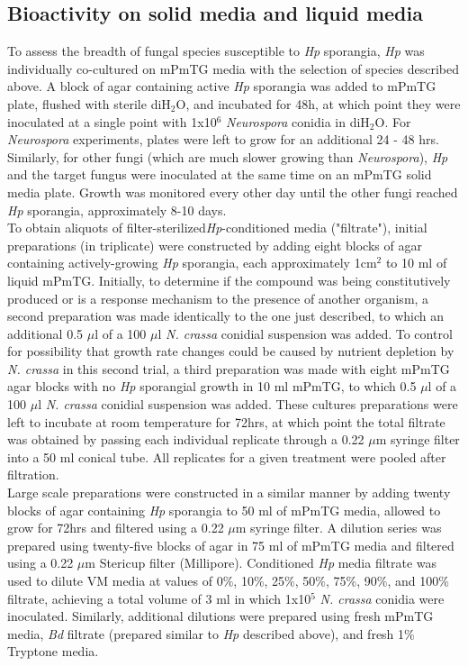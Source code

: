 \subsection*{Bioactivity on solid media and liquid media}
To assess the breadth of fungal species susceptible to \textit{Hp} sporangia, \textit{Hp} was individually co-cultured on mPmTG media with the selection of species described above. A block of agar containing active \textit{Hp} sporangia was added to mPmTG plate, flushed with sterile diH$_{2}$O, and incubated for 48h, at which point they were inoculated at a single point with 1x10$^{6}$ \textit{Neurospora} conidia in diH$_{2}$O. For \textit{Neurospora} experiments, plates were left to grow for an additional 24 - 48 hrs.\\
\indent Similarly, for other fungi (which are much slower growing than \textit{Neurospora}), \textit{Hp} and the target fungus were inoculated at the same time on an mPmTG solid media plate. Growth was monitored every other day until the other fungi reached \textit{Hp} sporangia, approximately 8-10 days.\\
\indent To obtain aliquots of filter-sterilized\textit{Hp}-conditioned media ("filtrate"), initial preparations (in triplicate) were constructed by adding eight blocks of agar containing actively-growing \textit{Hp} sporangia, each approximately 1cm$^{2}$ to 10 ml of liquid mPmTG. Initially, to determine if the compound was being constitutively produced or is a response mechanism to the presence of another organism, a second preparation was made identically to the one just described, to which an additional 0.5 $\mu$l of a 100 $\mu$l  \textit{N. crassa} conidial suspension was added. To control for possibility that growth rate changes could be caused by nutrient depletion by \textit{N. crassa} in this second trial, a third preparation was made with eight mPmTG agar blocks with no \textit{Hp} sporangial growth in 10 ml mPmTG, to which 0.5 $\mu$l of a 100 $\mu$l \textit{N. crassa} conidial suspension was added. These cultures preparations were left to incubate at room temperature for 72hrs, at which point the total filtrate was obtained by passing each individual replicate through a 0.22 $\mu$m syringe filter into a 50 ml conical tube. All replicates for a given treatment were pooled after filtration. \\
\indent Large scale preparations were constructed in a similar manner by adding twenty blocks of agar containing \textit{Hp} sporangia to 50 ml of mPmTG media, allowed to grow for 72hrs and filtered using a 0.22 $\mu$m syringe filter. A dilution series was prepared using twenty-five blocks of agar in 75 ml of mPmTG media and filtered using a 0.22 $\mu$m Stericup filter (Millipore). Conditioned \textit{Hp} media filtrate was used to dilute VM media at values of 0\%, 10\%, 25\%, 50\%, 75\%, 90\%, and 100\% filtrate, achieving a total volume of 3 ml in which 1x10$^{5}$ \textit{N. crassa} conidia were inoculated. Similarly, additional dilutions were prepared using fresh mPmTG media, \textit{Bd} filtrate (prepared similar to \textit{Hp} described above), and fresh 1\% Tryptone media.\\
